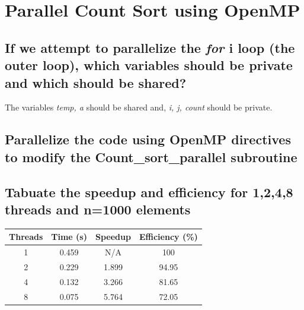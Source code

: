 
\section{Parallel Count Sort using OpenMP}

\subsection{If we attempt to parallelize the \emph{for} i loop (the outer loop),
which variables should be private and which should be shared?}

The variables \emph{temp, a} should be shared and, \emph{i, j, count} should
be private.

\subsection{Parallelize the code using OpenMP directives to modify the 
Count\_sort\_parallel subroutine}

\vspace{0.5cm}

    

\subsection{Tabuate the speedup and efficiency for 1,2,4,8 threads and n=1000
elements}

\begin{center}
\begin{tabular}{|| c | c | c | c ||}
	\hline
	Threads & Time (s) & Speedup & Efficiency (\%) \\ [0.5ex]
	\hline 
	1 & 0.459 & N/A & 100 \\
	2 & 0.229 & 1.899 & 94.95 \\
	4 & 0.132 & 3.266 & 81.65 \\
	8 & 0.075 & 5.764 & 72.05 \\
	\hline
\end{tabular}
\end{center}


